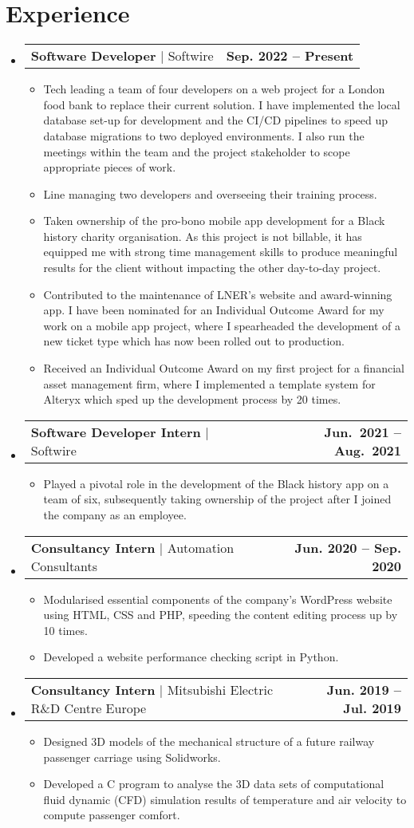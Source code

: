 \documentclass[letterpaper,10pt]{article}
\makeatletter
\newcommand{\resumeItem}[1]{
  \item\small{
    {#1 \vspace{-2pt}}
  }
}
\newcommand{\experienceItemHeading}[3]{
  \vspace{-2pt}
  \item
  \begin{tabular*}{0.97\textwidth}[t]{l@{\extracolsep{\fill}}r}
    \textbf{#1} $|$ #3 & \textbf{#2}
  \end{tabular*}\vspace{-7pt}
}
\newcommand{\resumeSubHeadingListStart}{\begin{itemize}[leftmargin=0.15in, label={}]}
\newcommand{\resumeSubHeadingListEnd}{\end{itemize}}
\newcommand{\resumeItemListStart}{\begin{itemize}}
\newcommand{\resumeItemListEnd}{\end{itemize}\vspace{-5pt}}
\makeatother
\begin{document}
\section{Experience}
  \resumeSubHeadingListStart
    \experienceItemHeading
      {Software Developer}
			{Sep. 2022 -- Present}
      {Softwire}
    \resumeItemListStart
      \resumeItem{Tech leading a team of four developers on a web project for a London food bank to replace their current solution. I have implemented the local database set-up for development and the CI/CD pipelines to speed up database migrations to two deployed environments. I also run the meetings within the team and the project stakeholder to scope appropriate pieces of work.}
      \resumeItem{Line managing two developers and overseeing their training process.}
			\resumeItem{Taken ownership of the pro-bono mobile app development for a Black history charity organisation. As this project is not billable, it has equipped me with strong time management skills to produce meaningful results for the client without impacting the other day-to-day project.}
			\resumeItem{Contributed to the maintenance of LNER’s website and award-winning app. I have been nominated for an Individual Outcome Award for my work on a mobile app project, where I spearheaded the development of a new ticket type which has now been rolled out to production.}
      \resumeItem{Received an Individual Outcome Award on my first project for a financial asset management firm, where I implemented a template system for Alteryx which sped up the development process by 20 times.}
    \resumeItemListEnd

    \experienceItemHeading
      {Software Developer Intern}
      {Jun.\ 2021 -- Aug.\ 2021}
      {Softwire}
    \resumeItemListStart
      \resumeItem{Played a pivotal role in the development of the Black history app on a team of six, subsequently taking
      ownership of the project after I joined the company as an employee.}
    \resumeItemListEnd

    \experienceItemHeading
      {Consultancy Intern}
			{Jun. 2020 -- Sep. 2020}
      {Automation Consultants}
    \resumeItemListStart
      \resumeItem{Modularised essential components of the company’s WordPress website using HTML, CSS and PHP,
      speeding the content editing process up by 10 times.}
      \resumeItem{Developed a website performance checking script in Python.}
    \resumeItemListEnd

    \experienceItemHeading
      {Consultancy Intern}
			{Jun. 2019 -- Jul. 2019}
      {Mitsubishi Electric R\&D Centre Europe}
    \resumeItemListStart
      \resumeItem{Designed 3D models of the mechanical structure of a future railway passenger carriage using
      Solidworks.}
      \resumeItem{Developed a C program to analyse the 3D data sets of computational fluid dynamic (CFD) simulation
      results of temperature and air velocity to compute passenger comfort.}
    \resumeItemListEnd
  \resumeSubHeadingListEnd
\end{document}
